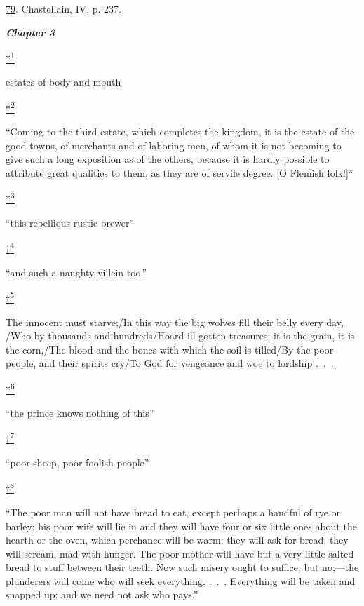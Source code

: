 \protect\hypertarget{23_NOTES.xhtmlux5cux23id_1932}{\protect\hyperlink{09_Chapter_Two__THE_CRAVING_FOR_A_M.xhtmlux5cux23id_1931}{79}}.
Chastellain, IV, p. 237.

\textbf{\emph{Chapter 3}}

\protect\hypertarget{23_NOTES.xhtmlux5cux23id_2466}{\protect\hyperlink{10_Chapter_Three__THE_HEROIC_DREAM.xhtmlux5cux23id_2465}{*\textsuperscript{1}}}
estates of body and mouth

\protect\hypertarget{23_NOTES.xhtmlux5cux23id_2468}{\protect\hyperlink{10_Chapter_Three__THE_HEROIC_DREAM.xhtmlux5cux23id_2467}{*\textsuperscript{2}}}
``Coming to the third estate, which completes the kingdom, it is the
estate of the good towns, of merchants and of laboring men, of whom it
is not becoming to give such a long exposition as of the others, because
it is hardly possible to attribute great qualities to them, as they are
of servile degree. {[}O Flemish folk!{]}''

\protect\hypertarget{23_NOTES.xhtmlux5cux23id_2470}{\protect\hyperlink{10_Chapter_Three__THE_HEROIC_DREAM.xhtmlux5cux23id_2469}{*\textsuperscript{3}}}
``this rebellious rustic brewer''

\protect\hypertarget{23_NOTES.xhtmlux5cux23id_2472}{\protect\hyperlink{10_Chapter_Three__THE_HEROIC_DREAM.xhtmlux5cux23id_2471}{†\textsuperscript{4}}}
``and such a naughty villein too.''

\protect\hypertarget{23_NOTES.xhtmlux5cux23id_2474}{\protect\hyperlink{10_Chapter_Three__THE_HEROIC_DREAM.xhtmlux5cux23id_2473}{‡\textsuperscript{5}}}
The innocent must starve;/In this way the big wolves fill their belly
every day, /Who by thousands and hundreds/Hoard ill-gotten treasures; it
is the grain, it is the corn,/The blood and the bones with which the
soil is tilled/By the poor people, and their spirits cry/To God for
vengeance and woe to lordship .~.~.

\protect\hypertarget{23_NOTES.xhtmlux5cux23id_2476}{\protect\hyperlink{10_Chapter_Three__THE_HEROIC_DREAM.xhtmlux5cux23id_2475}{*\textsuperscript{6}}}
``the prince knows nothing of this''

\protect\hypertarget{23_NOTES.xhtmlux5cux23id_2478}{\protect\hyperlink{10_Chapter_Three__THE_HEROIC_DREAM.xhtmlux5cux23id_2477}{†\textsuperscript{7}}}
``poor sheep, poor foolish people''

\protect\hypertarget{23_NOTES.xhtmlux5cux23id_2480}{\protect\hyperlink{10_Chapter_Three__THE_HEROIC_DREAM.xhtmlux5cux23id_2479}{‡\textsuperscript{8}}}
``The poor man will not have bread to eat, except perhaps a handful of
rye or barley; his poor wife will lie in and they will have four or six
little ones about the hearth or the oven, which perchance will be warm;
they will ask for bread, they will scream, mad with hunger. The poor
mother will have but a very little salted bread to stuff between their
teeth. Now such misery ought to suffice; but no;---the plunderers will
come who will seek everything. .~.~. Everything will be taken and
snapped up; and we need not ask who pays.''

